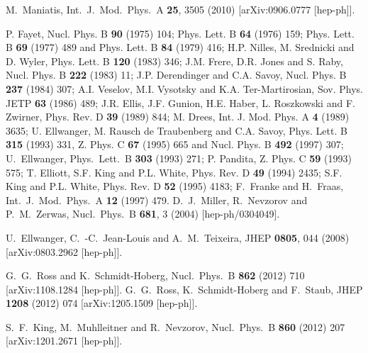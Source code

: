 \documentclass[final,3p,times]{elsarticle}
\begin{document}
\begin{thebibliography}{10}
  M.~Maniatis,
  Int.\ J.\ Mod.\ Phys.\ A {\bf 25}, 3505 (2010)
  [arXiv:0906.0777 [hep-ph]].


 P. Fayet, Nucl. Phys. B \textbf{90} (1975) 104; Phys. Lett.
B \textbf{64} (1976) 159; Phys. Lett. B \textbf{69} (1977) 489 and Phys. Lett. B
\textbf{84} (1979) 416; H.P. Nilles, M. Srednicki and D. Wyler, Phys. Lett. B
\textbf{120} (1983) 346; J.M. Frere, D.R. Jones and S. Raby, Nucl. Phys. B
\textbf{222} (1983) 11; J.P. Derendinger and C.A. Savoy, Nucl. Phys. B
\textbf{237} (1984) 307;  A.I. Veselov, M.I. Vysotsky and K.A. Ter-Martirosian,
Sov. Phys. JETP \textbf{63} (1986) 489; J.R. Ellis, J.F. Gunion, H.E. Haber, L.
Roszkowski and F. Zwirner, Phys. Rev. D \textbf{39}  (1989) 844; M. Drees, Int.
J. Mod. Phys. A \textbf{4}  (1989) 3635; U. Ellwanger, M. Rausch de
Traubenberg and C.A. Savoy, Phys. 
Lett. B \textbf{315} (1993) 331, Z. Phys. C {\bf 67} (1995) 665 and Nucl. Phys.
B \textbf{492} (1997) 307; U.~Ellwanger, Phys.\ Lett.\  B {\bf 303} (1993) 271; P.
Pandita, Z. Phys. C \textbf{59} (1993) 575; T. Elliott, S.F. King and P.L.
White, Phys. Rev. D {\bf 49} (1994) 2435; S.F. King and P.L. White, Phys. Rev. D
\textbf{52} (1995) 4183;  F.~Franke and H.~Fraas, Int.\ J.\ Mod.\ Phys.\  A {\bf
12} (1997) 479.   D.~J.~Miller, R.~Nevzorov and P.~M.~Zerwas,  Nucl.\ Phys.\ B {\bf 681}, 3 (2004) [hep-ph/0304049].

  U.~Ellwanger, C.~-C.~Jean-Louis and A.~M.~Teixeira,
  JHEP {\bf 0805}, 044 (2008)
  [arXiv:0803.2962 [hep-ph]].


  G.~G.~Ross and K.~Schmidt-Hoberg,
  Nucl.\ Phys.\ B {\bf 862} (2012) 710
  [arXiv:1108.1284 [hep-ph]].
  G.~G.~Ross, K.~Schmidt-Hoberg and F.~Staub,
  JHEP {\bf 1208} (2012) 074
  [arXiv:1205.1509 [hep-ph]].

  S.~F.~King, M.~Muhlleitner and R.~Nevzorov,
  Nucl.\ Phys.\ B {\bf 860} (2012) 207
  [arXiv:1201.2671 [hep-ph]].


\end{thebibliography}
\end{document}
